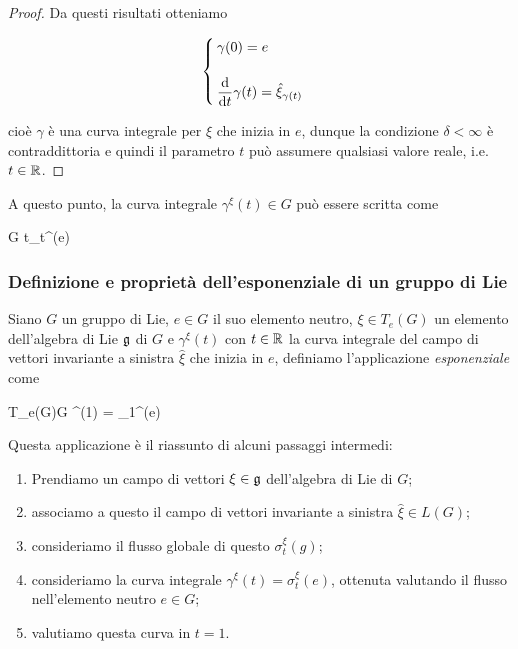 \begin{proof}
	Da questi risultati otteniamo
		
	\begin{equation}
		\begin{cases}
			\gamma(0) = e \\\\
			\ddv{t} \gamma(t) = \hat{\xi}_{\gamma(t)}
		\end{cases}
	\end{equation}	
	
	cioè $ \gamma $ è una curva integrale per $ \hat{\xi} $ che inizia in $ e $, dunque la condizione $ \delta < \infty $ è contraddittoria e quindi il parametro $ t $ può assumere qualsiasi valore reale, i.e. $ t \in \mathbb{R} $.
\end{proof}

A questo punto, la curva integrale $ \gamma^{\xi}(t) \in G $ può essere scritta come

\map{\gamma^{\xi}}
	{\R}{G}
	{t}{\sigma_{t}^{\xi}(e)}

\subsubsection{Definizione e proprietà dell'esponenziale di un gruppo di Lie}

Siano $ G $ un gruppo di Lie, $ e \in G $ il suo elemento neutro, $ \xi \in T_{e}(G) $ un elemento dell'algebra di Lie $ \mathfrak{g} $ di $ G $ e $ \gamma^{\xi}(t) $ con $ t \in \mathbb{R} $ la curva integrale del campo di vettori invariante a sinistra $ \hat{\xi} $ che inizia in $ e $, definiamo l'applicazione \textit{esponenziale} come

\map{\exp}
	{T_{e}(G)}{G}
	{\xi}{\gamma^{\xi}(1) = \sigma_{1}^{\xi}(e)}

Questa applicazione è il riassunto di alcuni passaggi intermedi:

\begin{enumerate}
	\item Prendiamo un campo di vettori $ \xi \in \mathfrak{g} $ dell'algebra di Lie di $ G $;
	
	\item associamo a questo il campo di vettori invariante a sinistra $ \hat{\xi} \in L(G) $;
	
	\item consideriamo il flusso globale di questo $ \sigma_{t}^{\xi}(g) $;
	
	\item consideriamo la curva integrale $ \gamma^{\xi}(t) = \sigma_{t}^{\xi}(e) $, ottenuta valutando il flusso nell'elemento neutro $ e \in G $;
	
	\item valutiamo questa curva in $ t=1 $.
\end{enumerate}


